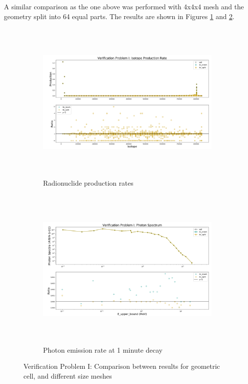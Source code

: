 %
A similar comparison as the one above was performed with 4x4x4 mesh and
the geometry split into 64 equal parts. The results are shown in Figures
\ref{fig:1prod_cell_4x} and \ref{fig:1spec_cell_4x}.
\begin{figure}[h!]
 \begin{centering}
 \centering
 \begin{subfigure}[b]{.8\textwidth}
 \includegraphics[width=0.99\linewidth,height=8cm]{../figs/toy_p1/prod_VPI_4x.png}
 \caption{Radionuclide production rates}
 \label{fig:1prod_cell_4x}
 \end{subfigure}
 \hspace{0.05cm}
 \begin{subfigure}[b]{.8\textwidth}
 \centering
 \includegraphics[width=.99\linewidth,height=8cm]{../figs/toy_p1/spec_VPI_4x.png}
 \caption{Photon emission rate at 1 minute decay }
 \label{fig:1spec_cell_4x}
 \end{subfigure}
 \caption{Verification Problem I: Comparison between results for geometric cell, and different size meshes}
 \label{fig:cell_4x}
 \end{centering}
\end{figure}

